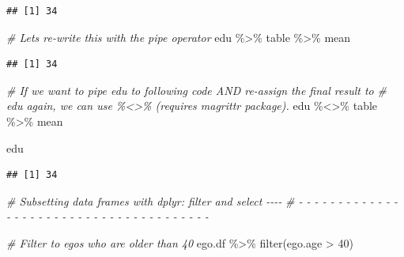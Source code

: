 \documentclass[
]{book}
\newenvironment{Shaded}{\begin{snugshade}}{\end{snugshade}}
\newcommand{\CommentTok}[1]{\textcolor[rgb]{0.56,0.35,0.01}{\textit{#1}}}
\newcommand{\DecValTok}[1]{\textcolor[rgb]{0.00,0.00,0.81}{#1}}
\newcommand{\FunctionTok}[1]{\textcolor[rgb]{0.00,0.00,0.00}{#1}}
\newcommand{\NormalTok}[1]{#1}
\newcommand{\SpecialCharTok}[1]{\textcolor[rgb]{0.00,0.00,0.00}{#1}}
\begin{document}
\begin{verbatim}
## [1] 34
\end{verbatim}

\begin{Shaded}
\begin{Highlighting}[]
\CommentTok{\# Let\textquotesingle{}s re{-}write this with the pipe operator}
\NormalTok{edu }\SpecialCharTok{\%\textgreater{}\%}
\NormalTok{  table }\SpecialCharTok{\%\textgreater{}\%}
\NormalTok{  mean}
\end{Highlighting}
\end{Shaded}

\begin{verbatim}
## [1] 34
\end{verbatim}

\begin{Shaded}
\begin{Highlighting}[]
\CommentTok{\# If we want to pipe edu to following code AND re{-}assign the final result to }
\CommentTok{\# edu again, we can use \%\textless{}\textgreater{}\% (requires magrittr package).}
\NormalTok{edu }\SpecialCharTok{\%\textless{}\textgreater{}\%}
\NormalTok{  table }\SpecialCharTok{\%\textgreater{}\%}
\NormalTok{  mean}

\NormalTok{edu}
\end{Highlighting}
\end{Shaded}

\begin{verbatim}
## [1] 34
\end{verbatim}

\begin{Shaded}
\begin{Highlighting}[]
\CommentTok{\# Subsetting data frames with dplyr: filter and select                      {-}{-}{-}{-}}
\CommentTok{\# {-} {-} {-} {-} {-} {-} {-} {-} {-} {-} {-} {-} {-} {-} {-} {-} {-} {-} {-} {-} {-} {-} {-} {-} {-} {-} {-} {-} {-} {-} {-} {-} {-} {-} {-} {-} {-} {-} {-} }

\CommentTok{\# Filter to egos who are older than 40}
\NormalTok{ego.df }\SpecialCharTok{\%\textgreater{}\%}
  \FunctionTok{filter}\NormalTok{(ego.age }\SpecialCharTok{\textgreater{}} \DecValTok{40}\NormalTok{)}
\end{Highlighting}
\end{Shaded}
\end{document}
